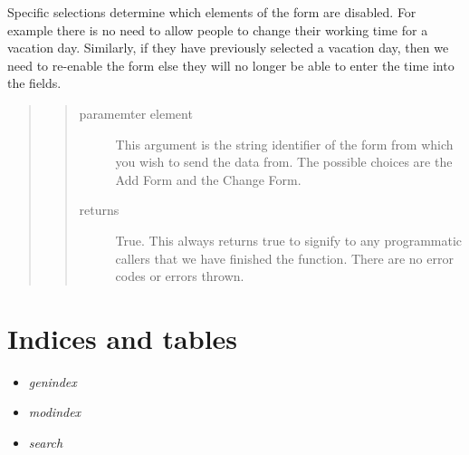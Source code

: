 \documentclass[letterpaper,10pt,english]{sphinxmanual}
\begin{document}
Specific selections determine which elements of the form are disabled. For
example there is no need to allow people to change their working time for a
vacation day. Similarly, if they have previously selected a vacation day, then
we need to re-enable the form else they will no longer be able to enter the
time into the fields.
\begin{quote}
\begin{quote}\begin{description}
\item[{paramemter element}] \leavevmode
This argument is the string identifier of the form
from which you wish to send the data from. The
possible choices are the Add Form and the Change
Form.

\item[{returns}] \leavevmode
True. This always returns true to signify to any programmatic
callers that we have finished the function. There are no error
codes or errors thrown.

\end{description}\end{quote}
\end{quote}


\chapter{Indices and tables}
\label{index:indices-and-tables}\begin{itemize}
\item {} 
\emph{genindex}

\item {} 
\emph{modindex}

\item {} 
\emph{search}

\end{itemize}
\end{document}
